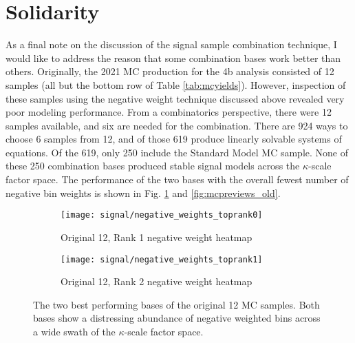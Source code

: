 \section{Solidarity} \label{sec:solidarity}
    
    As a final note on the discussion of the signal sample combination technique,
        I would like to address the reason that some combination bases work better than others.
    Originally, the 2021 MC production for the 4b analysis consisted of 12 samples (all but the bottom row of Table \ref{tab:mcyields}).
    However, inspection of these samples using the negative weight technique discussed above revealed very poor modeling performance.
    From a combinatorics perspective, there were 12 samples available, and six are needed for the combination.
    There are 924 ways to choose 6 samples from 12, and of those 619 produce linearly solvable systems of equations.
    Of the 619, only 250 include the Standard Model MC sample.
    None of these 250 combination bases produced stable signal models across the $\kappa$-scale factor space.
    The performance of the two bases with the overall fewest number of negative bin weights is shown in Fig. \ref{fig:mcnWeight_old} and \ref{fig:mcpreviews_old}.

    \begin{figure}[tbh]
    	\centering
        \begin{subfigure}{0.44\textwidth}
            \texttt{[image: signal/negative\_weights\_toprank0]}
            \captionsetup{justification=centering} \caption{Original 12, Rank 1 negative weight heatmap}
        \end{subfigure}
        \begin{subfigure}{0.44\textwidth}
            \texttt{[image: signal/negative\_weights\_toprank1]}
            \captionsetup{justification=centering} \caption{Original 12, Rank 2 negative weight heatmap}
        \end{subfigure}
        \caption{
            The two best performing bases of the original 12 MC samples.
            Both bases show a distressing abundance of negative weighted bins across a wide swath of the $\kappa$-scale factor space.
        }
        \label{fig:mcnWeight_old}
    \end{figure}



